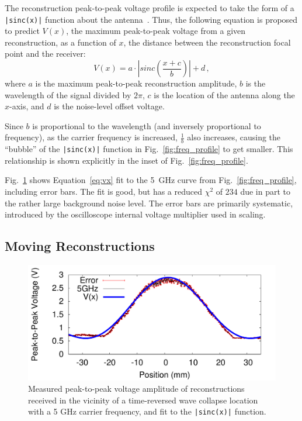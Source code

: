 The reconstruction peak-to-peak voltage profile is expected to take the form of
a \texttt{|sinc(x)|} function about the antenna~\cite{lerosey-focusing}.
%
Thus, the following equation is proposed to predict $V(x)$, the maximum
peak-to-peak voltage from a given reconstruction, as a function of $x$, the
distance between the reconstruction focal point and the receiver:
%
\begin{equation}\label{eq:vx}
V(x)=a\cdot \left|sinc\left(\frac{x+c}{b}\right)\right|+d\,,
\end{equation}
%
\noindent where $a$ is the maximum peak-to-peak reconstruction amplitude, $b$ is
the wavelength of the signal divided by $2\pi$, $c$ is the location of the
antenna along the $x$-axis, and $d$ is the noise-level offset voltage.



Since $b$ is proportional to the wavelength (and inversely proportional to
frequency), as the carrier frequency is increased, $\frac{1}{b}$ also increases,
causing the ``bubble'' of the \texttt{|sinc(x)|} function in
Fig.~\ref{fig:freq_profile} to get smaller.
%
This relationship is shown explicitly in the inset of
Fig.~\ref{fig:freq_profile}.



Fig.~\ref{fig:error_fit} shows Equation~\ref{eq:vx} fit to the 5~GHz curve from
Fig.~\ref{fig:freq_profile}, including error bars.
%
The fit is good, but has a reduced $\chi^2$ of $234$ due in part to the rather
large background noise level.
%
The error bars are primarily systematic, introduced by the oscilloscope internal
voltage multiplier used in scaling.

\subsection{Moving Reconstructions}
\label{sec:moving}


\begin{figure}[t!]
\includegraphics[width=\columnwidth]{figs/fit.pdf}
\caption{Measured peak-to-peak voltage amplitude of reconstructions received in the
vicinity of a time-reversed wave collapse location with a 5 GHz carrier
frequency, and fit to the \texttt{|sinc(x)|} function.}
\label{fig:error_fit}
\end{figure}


